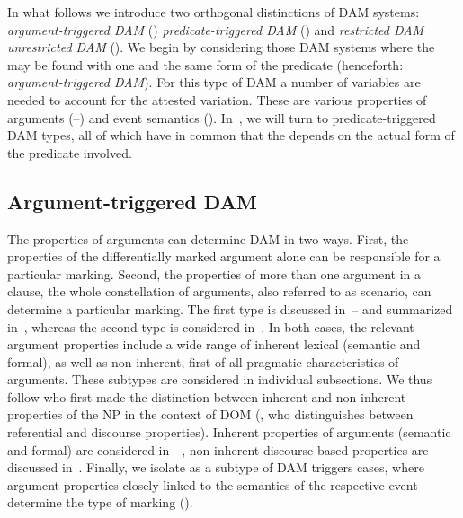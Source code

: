 \documentclass[output=paper]{LSP/langsci}
\begin{document}
In what follows we introduce two orthogonal distinctions of DAM systems: \textit{argument-triggered DAM} () \vs \textit{predicate-triggered DAM} () and \textit{restricted DAM} \vs \textit{unrestricted DAM} (). 
We begin by considering those DAM systems where the  may be found with one and the same form of the predicate (henceforth: \textit{argument-triggered DAM}). 
For this type of DAM a number of variables are needed to account for the attested variation. 
These are various properties of arguments (–) and event semantics ().
In~, we will turn to predicate-triggered DAM types, all of which have in common that the  depends on the actual form of the predicate involved. 


\subsection{Argument-triggered DAM}
\label{01-wi-sec:2.1-Argument-triggered}

The properties of arguments can determine DAM in two ways. 
First, the properties of the differentially marked argument alone can be responsible for a particular marking. Second, the properties of more than one argument in a clause, \ie the whole constellation of arguments, also referred to as scenario, can determine a particular marking. 
The first type is discussed in~– and summarized in~, whereas the second type is considered in~. 
In both cases, the relevant argument properties include a wide range of inherent lexical (semantic and formal), as well as non-inherent, first of all pragmatic characteristics of arguments. These subtypes are considered in individual subsections. 
We thus follow \citet[159]{Bossong1991Differential} who first made the distinction between inherent and non-inherent properties of the NP in the context of DOM (\cf \citealt[282]{Sinnemki2014Typological}, who distinguishes between referential and discourse properties). 
Inherent properties of arguments (semantic and formal) are considered in~–, non-inherent discourse-based properties are discussed in~. 
Finally, we isolate as a subtype of DAM triggers cases, where argument properties closely linked to the semantics of the respective event determine the type of marking ().
\end{document}
